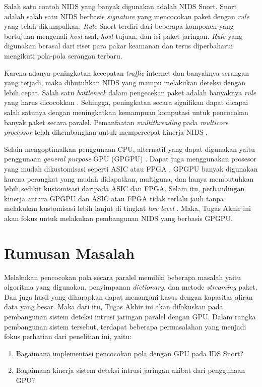   Salah satu contoh NIDS yang banyak digunakan adalah NIDS Snort. Snort adalah salah satu NIDS berbasis \emph{signature} yang mencocokan paket dengan \emph{rule} yang telah dikumpulkan. \emph{Rule} Snort terdiri dari beberapa komponen yang bertujuan mengenali \emph{host} asal, \emph{host} tujuan, dan isi paket jaringan. \emph{Rule} yang digunakan berasal dari riset para pakar keamanan dan terus diperbaharui mengikuti pola-pola serangan terbaru.

  Karena adanya peningkatan kecepatan \emph{traffic} internet dan banyaknya serangan yang terjadi, maka dibutuhkan NIDS yang mampu melakukan deteksi dengan lebih cepat. Salah satu \emph{bottleneck} dalam pengecekan paket adalah banyaknya \emph{rule} yang harus dicocokkan \citep{pcre2007}. Sehingga, peningkatan secara signifikan dapat dicapai salah satunya dengan meningkatkan kemampuan komputasi untuk pencocokan banyak paket secara paralel. Pemanfaatan \emph{multithreading} pada \emph{multicore processor} telah dikembangkan untuk mempercepat kinerja NIDS \citep{multi2004}.

  Selain mengoptimalkan penggunaan CPU, alternatif yang dapat digunakan yaitu penggunaan \emph{general purpose} GPU (GPGPU) \citep{4482891}. Dapat juga menggunakan prosesor yang mudah dikustomisasi seperti ASIC atau FPGA \citep{fpga2008}. GPGPU banyak digunakan karena perangkat yang mudah didapatkan, multiguna, dan hanya membutuhkan lebih sedikit kustomisasi daripada ASIC dan FPGA. Selain itu, perbandingan kinerja antara GPGPU dan ASIC atau FPGA tidak terlalu jauh tanpa melakukan kustomisasi lebih lanjut di tingkat \emph{low level} \citep{gnort2008}. Maka, Tugas Akhir ini akan fokus untuk melakukan pembangunan NIDS yang berbasis GPGPU.

\section{Rumusan Masalah}

  Melakukan pencocokan pola secara paralel memiliki beberapa masalah yaitu algoritma yang digunakan, penyimpanan \emph{dictionary}, dan metode \emph{streaming} paket. Dan juga hasil yang diharapkan dapat menangani kasus dengan kapasitas aliran data yang besar. Maka dari itu, Tugas Akhir ini akan difokuskan pada pembangunan sistem deteksi intrusi jaringan paralel dengan GPU. Dalam rangka pembangunan sistem tersebut, terdapat beberapa permasalahan yang menjadi fokus perhatian dari penelitian ini, yaitu: 

  \begin{enumerate}
      \item Bagaimana implementasi pencocokan pola dengan GPU pada IDS Snort?
      \item Bagaimana kinerja sistem deteksi intrusi jaringan akibat dari penggunaan GPU?
  \end{enumerate}

